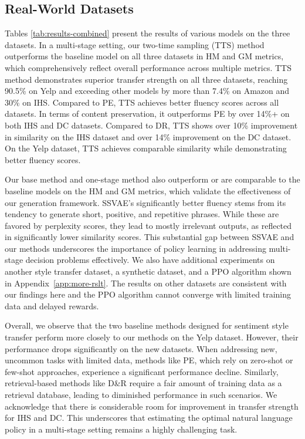 \documentclass{article}
\begin{document}
\subsection{Real-World Datasets}
Tables \ref{tab:results-combined} present the results of various models on the three datasets. In a multi-stage setting, our two-time sampling (TTS) method outperforms the baseline model on all three datasets in HM and GM metrics, which comprehensively reflect overall performance across multiple metrics. TTS method demonstrates superior transfer strength on all three datasets, reaching 90.5\% on Yelp and exceeding other models by more than 7.4\% on Amazon and 30\% on IHS. Compared to PE, TTS achieves better fluency scores across all datasets. In terms of content preservation, it outperforms PE by over 14\%+ on both IHS and DC datasets. Compared to DR, TTS shows over 10\% improvement in similarity on the IHS dataset and over 14\% improvement on the DC dataset. On the Yelp dataset, TTS achieves comparable similarity while demonstrating better fluency scores. 

Our base method and one-stage method also outperform or are comparable to the baseline models on the HM and GM metrics, which validate the effectiveness of our generation framework. SSVAE’s significantly better fluency stems from its tendency to generate short, positive, and repetitive phrases. While these are favored by perplexity scores, they lead to mostly irrelevant outputs, as reflected in significantly lower similarity scores. This substantial gap between SSVAE and our methods underscores the importance of policy learning in addressing multi-stage decision problems effectively. We also have additional experiments on another style transfer dataset, a synthetic dataset, and a PPO algorithm shown in Appendix~\ref{app:more-rslt}. The results on other datasets are consistent with our findings here and the PPO algorithm cannot converge with limited training data and delayed rewards.

Overall, we observe that the two baseline methods designed for sentiment style transfer perform more closely to our methods on the Yelp dataset. However, their performance drops significantly on the new datasets. When addressing new, uncommon tasks with limited data, methods like PE, which rely on zero-shot or few-shot approaches, experience a significant performance decline. Similarly, retrieval-based methods like D\&R require a fair amount of training data as a retrieval database, leading to diminished performance in such scenarios. We acknowledge that there is considerable room for improvement in transfer strength for IHS and DC. This underscores that estimating the optimal natural language policy in a multi-stage setting remains a highly challenging task.
\end{document}
